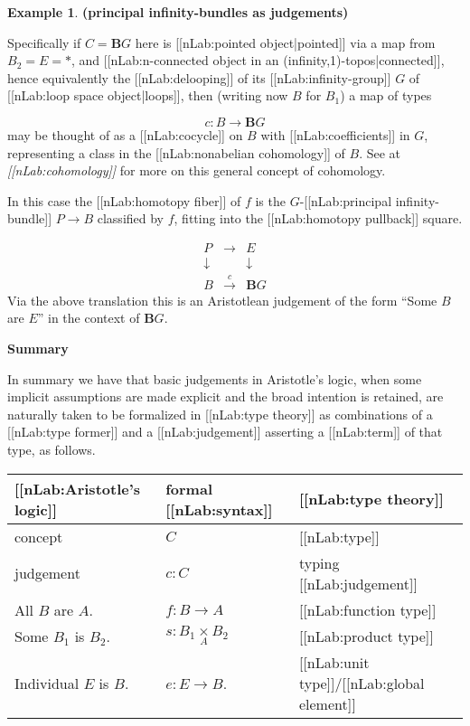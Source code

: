 \documentclass[12pt,titlepage]{article}
\newcommand{\itexarray}[1]{\begin{matrix}#1\end{matrix}}
\theoremstyle{plain}
\theoremstyle{definition}
\newtheorem{example}{Example}
\theoremstyle{remark}
\begin{document}
\begin{example}
\label{PrincipalBundlesAsJudgements}\hypertarget{PrincipalBundlesAsJudgements}{}
\textbf{(principal infinity-bundles as judgements)}

Specifically if $C = \mathbf{B}G$ here is [[nLab:pointed object|pointed]] via a map from $B_2 = E = \ast$, and [[nLab:n-connected object in an (infinity,1)-topos|connected]], hence equivalently the [[nLab:delooping]] of its [[nLab:infinity-group]] $G$ of [[nLab:loop space object|loops]], then (writing now $B$ for $B_1$) a map of types

\begin{displaymath}
c \colon B \longrightarrow \mathbf{B}G
\end{displaymath}
may be thought of as a [[nLab:cocycle]] on $B$ with [[nLab:coefficients]] in $G$, representing a class in the [[nLab:nonabelian cohomology]] of $B$. See at \emph{[[nLab:cohomology]]} for more on this general concept of cohomology.

In this case the [[nLab:homotopy fiber]] of $f$ is the $G$-[[nLab:principal infinity-bundle]] $P \to B$ classified by $f$, fitting into the [[nLab:homotopy pullback]] square.

\begin{displaymath}
\itexarray{
    P &\longrightarrow& E
    \\
    \downarrow && \downarrow
    \\
    B &\stackrel{c}{\longrightarrow} & \mathbf{B}G
  }
\end{displaymath}
Via the above translation this is an Aristotlean judgement of the form ``Some $B$ are $E$'' in the context of $\mathbf{B}G$.

\end{example}
\textbf{Summary}

In summary we have that basic judgements in Aristotle's logic, when some implicit assumptions are made explicit and the broad intention is retained, are naturally taken to be formalized in [[nLab:type theory]] as combinations of a [[nLab:type former]] and a [[nLab:judgement]] asserting a [[nLab:term]] of that type, as follows.

\begin{tabular}{l|l|l}
[[nLab:Aristotle's logic]]&formal [[nLab:syntax]]&[[nLab:type theory]]\\
\hline 
concept&$C$&[[nLab:type]]\\
judgement&$c \colon C$&typing [[nLab:judgement]]\\
All $B$ are $A$.&$f \colon B \longrightarrow A$&[[nLab:function type]]\\
Some $B_1$ is $B_2$.&$s \colon B_1 \underset{A}{\times} B_2$&[[nLab:product type]]\\
Individual $E$ is $B$.&$e \colon E \to B$.&[[nLab:unit type]]/[[nLab:global element]]\\
\end{tabular}
\end{document}
